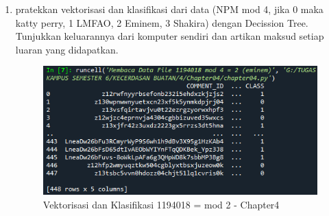 \begin{enumerate}
	\item pratekkan vektorisasi dan klasifikasi dari data (NPM mod 4, jika 0 maka katty perry, 1 LMFAO, 2 Eminem, 3 Shakira) dengan Decission Tree. Tunjukkan keluarannya dari komputer sendiri dan artikan maksud setiap luaran yang didapatkan.
	      \begin{figure}[ht]
		      \centerline{\includegraphics[scale=0.7]{figures/chappter4-3.png}}
		      \caption{Vektorisasi dan Klasifikasi 1194018 = mod 2 - Chapter4}
		      \label{Vektorisasi dan Klasifikasi 1194018 = mod 2 - Chapter4}
	      \end{figure}


\end{enumerate}
